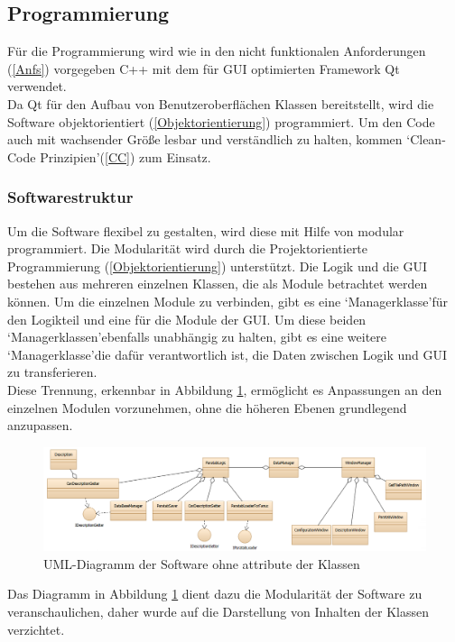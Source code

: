\subsection{Programmierung}
Für die Programmierung wird wie in den nicht funktionalen Anforderungen (\ref{Anfs}) vorgegeben C++ mit dem für \ac{GUI} optimierten Framework Qt verwendet. \\
Da Qt für den Aufbau von Benutzeroberflächen Klassen bereitstellt, wird die Software objektorientiert (\ref{Objektorientierung}) programmiert. Um den Code auch mit wachsender Größe lesbar und verständlich zu halten, kommen \lq Clean-Code Prinzipien\rq\space(\ref{CC}) zum Einsatz.\\
\subsubsection{Softwarestruktur}
Um die Software flexibel zu gestalten, wird diese mit Hilfe von modular programmiert. Die Modularität wird durch die Projektorientierte Programmierung (\ref{Objektorientierung}) unterstützt. Die Logik und die \ac{GUI} bestehen aus mehreren einzelnen Klassen, die als Module betrachtet werden können. Um die einzelnen Module zu verbinden, gibt es eine \lq Managerklasse\rq\space für den Logikteil und eine für die Module der \ac{GUI}. Um diese beiden \lq Managerklassen\rq\space ebenfalls unabhängig zu halten, gibt es eine weitere \lq Managerklasse\rq\space die dafür verantwortlich ist, die Daten zwischen Logik und \ac{GUI} zu transferieren. \\
Diese Trennung, erkennbar in Abbildung \ref{fig:UML}, ermöglicht es Anpassungen an den einzelnen Modulen vorzunehmen, ohne die höheren Ebenen grundlegend anzupassen.
\begin{figure}[H]\includegraphics[page=1,scale=0.49]{pictures_and_research/Bilder/uml.PNG}
\caption{\ac{UML}-Diagramm der Software ohne attribute der Klassen}
\label{fig:UML}
\end{figure}\noindent
Das Diagramm in Abbildung \ref{fig:UML} dient dazu die Modularität der Software zu veranschaulichen, daher wurde auf die Darstellung von Inhalten der Klassen verzichtet.\\
